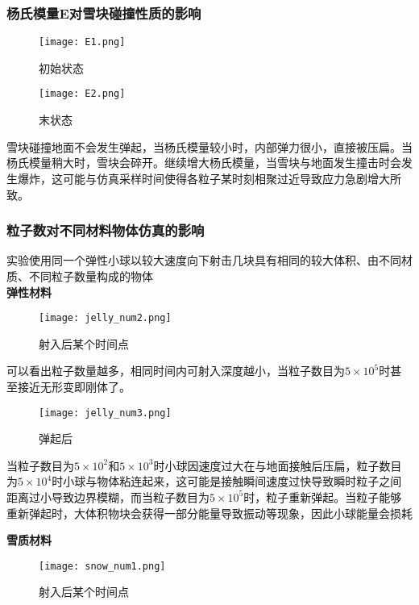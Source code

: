 \documentclass[14pt]{scrartcl} %
\begin{document}
\pagebreak
\subsubsection{杨氏模量E对雪块碰撞性质的影响}

\begin{figure}[h]
	\centering
	\texttt{[image: E1.png]} %
	\caption{初始状态}
	
	\centering
	\texttt{[image: E2.png]} %
	\caption{末状态}
\end{figure}

雪块碰撞地面不会发生弹起，当杨氏模量较小时，内部弹力很小，直接被压扁。当杨氏模量稍大时，雪块会碎开。继续增大杨氏模量，当雪块与地面发生撞击时会发生爆炸，这可能与仿真采样时间使得各粒子某时刻相聚过近导致应力急剧增大所致。

\pagebreak
\subsubsection{粒子数对不同材料物体仿真的影响}

实验使用同一个弹性小球以较大速度向下射击几块具有相同的较大体积、由不同材质、不同粒子数量构成的物体\\

\textbf{弹性材料}
\begin{figure}[h]
		\centering
	\texttt{[image: jelly\_num2.png]} %
	\caption{射入后某个时间点}
\end{figure}

可以看出粒子数量越多，相同时间内可射入深度越小，当粒子数目为$5\times 10^5$时甚至接近无形变即刚体了。

\pagebreak
\begin{figure}[h]
	\centering
	\texttt{[image: jelly\_num3.png]} %
	\caption{弹起后}
\end{figure}

当粒子数目为$5\times 10^2$和$5\times 10^3$时小球因速度过大在与地面接触后压扁，粒子数目为$5\times 10^4$时小球与物体粘连起来，这可能是接触瞬间速度过快导致瞬时粒子之间距离过小导致边界模糊，而当粒子数目为$5\times10^5$时，粒子重新弹起。当粒子能够重新弹起时，大体积物块会获得一部分能量导致振动等现象，因此小球能量会损耗

\pagebreak

\textbf{雪质材料}
\begin{figure}[h]
	\centering
	\texttt{[image: snow\_num1.png]} %
	\caption{射入后某个时间点}
\end{figure}
\end{document}
